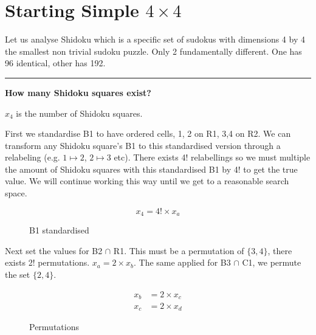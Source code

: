 \documentclass[a4paper,11pt]{report}
\newcounter{row}
\newcounter{col}
\newcounter{rowa}
\newcounter{cola}
\newcommand\setrowa[4]{
  \setcounter{cola}{1}
  \foreach \n in {#1, #2, #3, #4} {
    \edef\x{\value{cola} - 0.5}
    \edef\y{4.5 - \value{rowa}}
    \node[anchor=center] at (\x, \y) {\n};
    \stepcounter{cola}
  }
  \stepcounter{rowa}
}
\begin{document}
\section{Starting Simple $4 \times 4$}
Let us analyse Shidoku which is a specific set of sudokus with dimensions 4 by 4 the smallest non trivial sudoku puzzle. Only 2 fundamentally different. One has 96 identical, other has 192. 

\noindent\rule{4cm}{0.4pt}

\textbf{How many Shidoku squares exist?}

$x_4$ is the number of Shidoku squares.

First we standardise B1 to have ordered cells, 1, 2 on R1, 3,4 on R2. We can transform any Shidoku square's B1 to this standardised version through a relabeling (e.g. $1 \mapsto 2$, $2\mapsto 3$ etc). There exists 4! relabellings so we must multiple the amount of Shidoku squares with this standardised B1 by 4! to get the true value. We will continue working this way until we get to a reasonable search space.

\begin{equation}
x_4 = 4!\times x_a
\end{equation}

\begin{figure}[h]
\centering
{}
\caption{B1 standardised}
\label{fig:shidokurelabelling}
\end{figure}

Next set the values for B2 $\cap$ R1. This must be a permutation of $\{3,4\}$, there exists 2! permutations. $x_a = 2\times x_b$. The same applied for B3 $\cap$ C1, we permute the set $\{2,4\}$. 

\begin{eqnarray}x_b &= 2\times x_c\\ x_c &=2\times x_d\end{eqnarray}
\begin{figure}[h]
\centering
{}
\caption{Permutations}
\label{fig:shidokurelabelling}
\end{figure}
\end{document}

